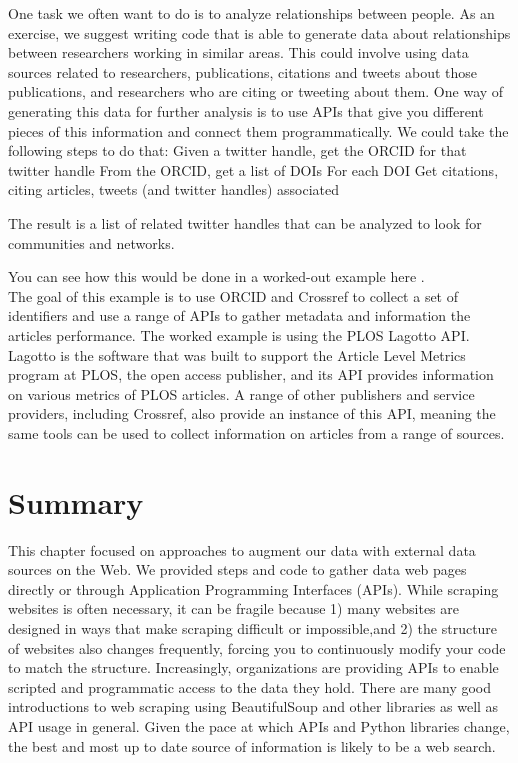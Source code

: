 \documentclass[]{krantz}
\begin{document}
One task we often want to do is to analyze relationships between people.
As an exercise, we suggest writing code that is able to generate data
about relationships between researchers working in similar areas. This
could involve using data sources related to researchers, publications,
citations and tweets about those publications, and researchers who are
citing or tweeting about them. One way of generating this data for
further analysis is to use APIs that give you different pieces of this
information and connect them programmatically. We could take the
following steps to do that: Given a twitter handle, get the ORCID for
that twitter handle From the ORCID, get a list of DOIs For each DOI Get
citations, citing articles, tweets (and twitter handles) associated

The result is a list of related twitter handles that can be analyzed to
look for communities and networks.

You can see how this would be done in a worked-out example here .\\
The goal of this example is to use ORCID and Crossref to collect a set
of identifiers and use a range of APIs to gather metadata and
information the articles performance. The worked example is using the
PLOS Lagotto API. Lagotto is the software that was built to support the
Article Level Metrics program at PLOS, the open access publisher, and
its API provides information on various metrics of PLOS articles. A
range of other publishers and service providers, including Crossref,
also provide an instance of this API, meaning the same tools can be used
to collect information on articles from a range of sources.

\section{Summary}\label{sec:4-9}

This chapter focused on approaches to augment our data with external
data sources on the Web. We provided steps and code to gather data web
pages directly or through Application Programming Interfaces (APIs).
While scraping websites is often necessary, it can be fragile because 1)
many websites are designed in ways that make scraping difficult or
impossible,and 2) the structure of websites also changes frequently,
forcing you to continuously modify your code to match the structure.
Increasingly, organizations are providing APIs to enable scripted and
programmatic access to the data they hold. There are many good
introductions to web scraping using BeautifulSoup and other libraries as
well as API usage in general. Given the pace at which APIs and Python
libraries change, the best and most up to date source of information is
likely to be a web search.
\end{document}
